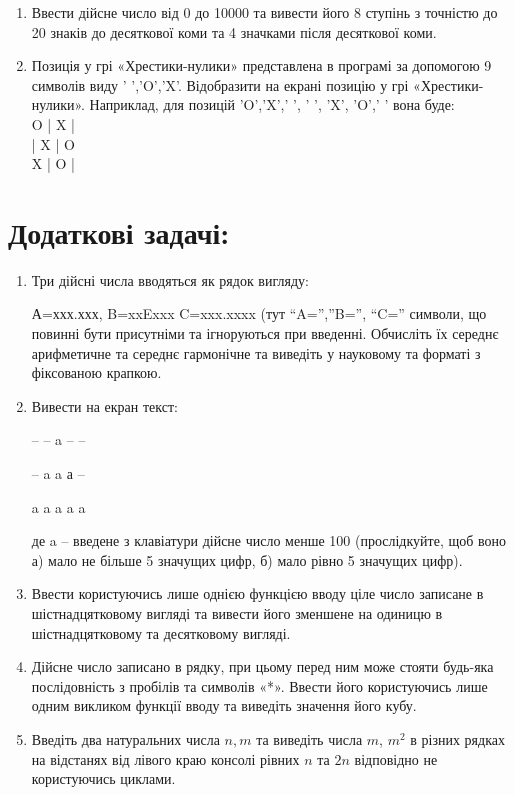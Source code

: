 \documentclass[a5paper,titlepage,openany,twoside,draft]{book_unv}%
\begin{document}
\begin{enumerate}
\item
  Ввести дійсне число від 0 до 10000 та вивести його 8 ступінь з
  точністю до 20 знаків до десяткової коми та 4 значками після
  десяткової коми.

\item
Позиція у  грі «Хрестики-нулики» представлена в програмі за допомогою 9 символів виду ' ','O','X'. 
Відобразити на екрані позицію у грі «Хрестики-нулики». 
Наприклад, для позицій 'O','X',' ', ' ', 'X', 'O',' ' вона буде:\\
O | X | \hspace*{7pt}  \\   
\hspace*{7pt} | X | O \\
X | O | \hspace*{7pt}  \\ 



\end{enumerate}

\section{Додаткові задачі:}

\begin{enumerate}
\def\labelenumi{\arabic{enumi}.}
\setcounter{enumi}{19}
\item
  Три дійсні числа вводяться як рядок вигляду:

А=ххх.ххх, B=xxExxx C=xxx.xxxx (тут ``A='',''B='', ``C='' символи, що
повинні бути присутніми та ігноруються при введенні. Обчисліть їх
середнє арифметичне та середнє гармонічне та виведіть у науковому та
форматі з фіксованою крапкою.

\item
  Вивести на екран текст:

-- \textbar{} -- \textbar{} a \textbar{} -- \textbar{} --

-- \textbar{} a \textbar{} a \textbar{} а \textbar{} --

a \textbar{} a \textbar{} a \textbar{} a \textbar{} a

де a -- введене з клавіатури дійсне число менше 100 (прослідкуйте, щоб
воно а) мало не більше 5 значущих цифр, б) мало рівно 5 значущих цифр).

\item
Ввести користуючись лише однією функцією вводу ціле число записане в шістнадцятковому вигляді та вивести його зменшене на одиницю в  шістнадцятковому та десятковому вигляді.

\item
Дійсне число записано в рядку, при цьому перед ним може стояти будь-яка послідовність з пробілів та символів «*». Ввести його  користуючись лише одним викликом функції вводу та виведіть значення його кубу.

\item
Введіть два натуральних числа $n, m$ та виведіть числа $m$, $m^{2}$ в різних рядках
 на відстанях від лівого краю консолі рівних $n$ та $2n$ відповідно не користуючись циклами.

\end{enumerate}
\end{document}
